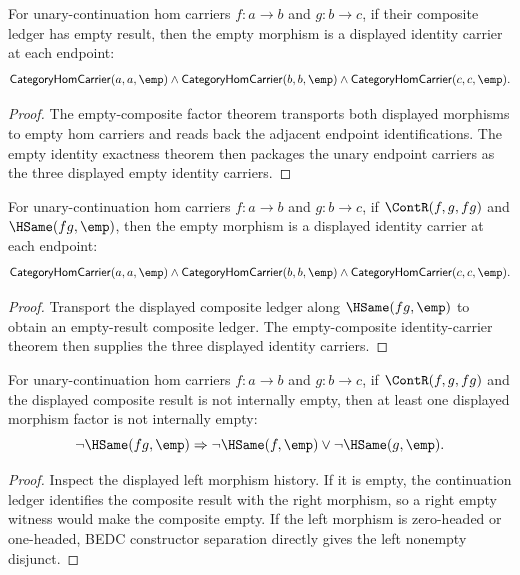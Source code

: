 \begin{theorem}
\label{thm:category-empty-composite-identity-carriers}
For unary-continuation hom carriers $f:a\to b$ and $g:b\to c$, if their
composite ledger has empty result, then the empty morphism is a displayed
identity carrier at each endpoint:
$$
\mathsf{CategoryHomCarrier}(a,a,\emp)\wedge
\mathsf{CategoryHomCarrier}(b,b,\emp)\wedge
\mathsf{CategoryHomCarrier}(c,c,\emp).
$$
\end{theorem}
\begin{proof}
The empty-composite factor theorem transports both displayed morphisms to
empty hom carriers and reads back the adjacent endpoint identifications. The
empty identity exactness theorem then packages the unary endpoint carriers as
the three displayed empty identity carriers.
\end{proof}

\begin{theorem}
\label{thm:category-hom-carrier-comp-result-empty-identity-carriers}
For unary-continuation hom carriers $f:a\to b$ and $g:b\to c$, if
$\ContR(f,g,fg)$ and $\HSame(fg,\emp)$, then the empty morphism is a displayed
identity carrier at each endpoint:
$$
\mathsf{CategoryHomCarrier}(a,a,\emp)\wedge
\mathsf{CategoryHomCarrier}(b,b,\emp)\wedge
\mathsf{CategoryHomCarrier}(c,c,\emp).
$$
\end{theorem}
\begin{proof}
Transport the displayed composite ledger along $\HSame(fg,\emp)$ to obtain an
empty-result composite ledger. The empty-composite identity-carrier theorem
then supplies the three displayed identity carriers.
\end{proof}



\begin{theorem}
\label{thm:category-hom-carrier-comp-result-nonempty-cases}
For unary-continuation hom carriers $f:a\to b$ and $g:b\to c$, if
$\ContR(f,g,fg)$ and the displayed composite result is not internally empty,
then at least one displayed morphism factor is not internally empty:
$$
\neg\HSame(fg,\emp)
\Rightarrow
\neg\HSame(f,\emp)\vee\neg\HSame(g,\emp).
$$
\end{theorem}
\begin{proof}
Inspect the displayed left morphism history. If it is empty, the continuation
ledger identifies the composite result with the right morphism, so a right
empty witness would make the composite empty. If the left morphism is
zero-headed or one-headed, BEDC constructor separation directly gives the left
nonempty disjunct.
\end{proof}

